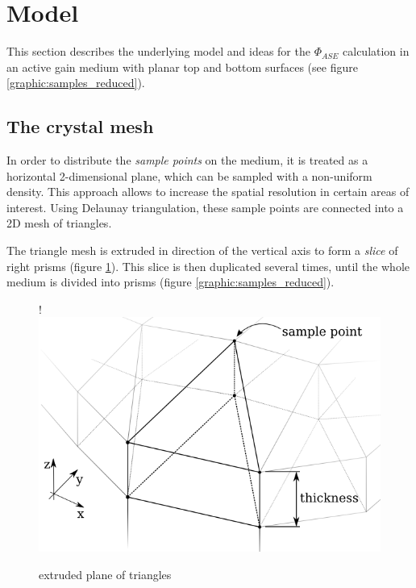 \section{Model}


This section describes the underlying model and ideas for the $\Phi_{ASE}$
calculation in an active gain medium with planar top and bottom surfaces (see
figure \ref{graphic:samples_reduced}).



\subsection{The crystal mesh} \label{subsec:meshSampling}

In order to distribute the \emph{sample points} on the medium, it is treated as
a horizontal 2-dimensional plane, which can be sampled with a non-uniform
density. This approach allows to increase the spatial resolution in certain
areas of interest. Using Delaunay triangulation, these sample points are
connected into a 2D mesh of triangles.

The triangle mesh is extruded in direction of the vertical axis to form a
\emph{slice} of right prisms (figure \ref{graphic:extruded_mesh}). This
slice is then duplicated several times, until the whole medium is divided into
prisms (figure \ref{graphic:samples_reduced}).

\begin{figure}
  \centerline{
     {!} {\includegraphics{graphics/delauny_3.png}}
  }
  \caption{extruded plane of triangles}
  \label{graphic:extruded_mesh}
\end{figure}

